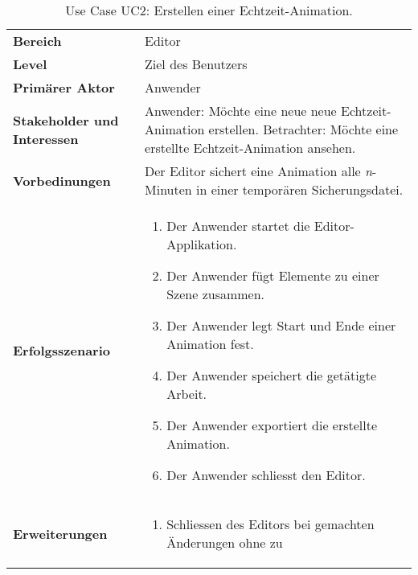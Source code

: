 
\begin{table}[H]
    \centering
    \caption{Use Case UC2: Erstellen einer Echtzeit-Animation.}\label{table:uc2-create-demo}
    \begin{tabular}{p{}p{}}
        \toprule
            \textbf{Bereich} &
            Editor \\
        \cmidrule(r){1-1}\cmidrule(lr){2-2}
            \textbf{Level} &
            Ziel des Benutzers \\
        \cmidrule(r){1-1}\cmidrule(lr){2-2}
            \textbf{Primärer Aktor} &
            Anwender \\
        \cmidrule(r){1-1}\cmidrule(lr){2-2}
            \textbf{Stakeholder und Interessen} &
            Anwender: Möchte eine neue neue Echtzeit-Animation erstellen.\newline
            Betrachter: Möchte eine erstellte Echtzeit-Animation ansehen. \\
        \cmidrule(r){1-1}\cmidrule(lr){2-2}
            \textbf{Vorbedinungen} &
            Der Editor sichert eine Animation alle \textit{n}-Minuten in einer
            temporären Sicherungsdatei. \\
        \cmidrule(r){1-1}\cmidrule(lr){2-2}
            \textbf{Erfolgsszenario} &
            \begin{enumerate}
                \item{Der Anwender startet die Editor-Applikation.}
                \item{Der Anwender fügt Elemente zu einer Szene zusammen.}
                \item{Der Anwender legt Start und Ende einer Animation fest.}
                \item{Der Anwender speichert die getätigte Arbeit.}
                \item{Der Anwender exportiert die erstellte Animation.}
                \item{Der Anwender schliesst den Editor.}
            \end{enumerate} \\
        \cmidrule(r){1-1}\cmidrule(lr){2-2}
            \textbf{Erweiterungen} &
            \begin{enumerate}[label= (\alph*)]
                \item{Schliessen des Editors bei gemachten Änderungen ohne zu
}
\end{enumerate}
\end{tabular}
\end{table}
